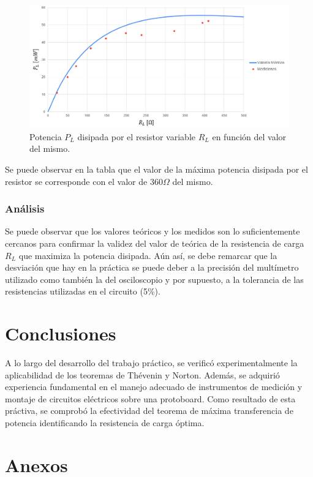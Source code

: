 \documentclass{article}
\begin{document}
            \begin{figure}[H]
                \centering
                \includegraphics[width=1\textwidth]{graficoPotencia.png}
                \caption{Potencia $P_L$ disipada por el resistor variable $R_L$ en función del valor del mismo.}
                \label{fig:graficoTransferenciaPotencia}
            \end{figure}

            \quad Se puede observar en la tabla que el valor de la máxima potencia disipada por el resistor se corresponde con el valor de $ 360 \Omega $ del mismo.

            \subsubsection{Análisis}
            \quad Se puede observar que los valores teóricos y los medidos son lo suficientemente cercanos para confirmar 
            la validez del valor de teórica de la resistencia de carga $R_L$ que maximiza la potencia disipada.
            Aún así, se debe remarcar que la desviación que hay en la práctica se puede deber a la precisión del multímetro utilizado como también la del osciloscopio
            y por supuesto, a la tolerancia de las resistencias utilizadas en el circuito (5\%).
    \section{Conclusiones}

    \quad A lo largo del desarrollo del trabajo práctico, se verificó experimentalmente
     la aplicabilidad de los teoremas de Thévenin y Norton. Además, se adquirió experiencia 
     fundamental en el manejo adecuado de instrumentos de medición y montaje de circuitos 
     eléctricos sobre una protoboard. Como resultado de esta práctiva, se comprobó la efectividad 
     del teorema de máxima transferencia de potencia identificando la resistencia de carga óptima.

    \section{Anexos}
\end{document}
